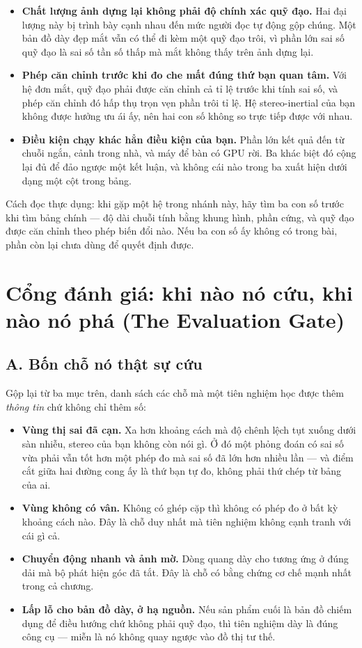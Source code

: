 \documentclass[../../deep_learning.tex]{subfiles}
\begin{document}
\begin{itemize}
\item \textbf{Chất lượng ảnh dựng lại không phải độ chính xác quỹ đạo.} Hai đại lượng này bị trình bày cạnh nhau đến mức người đọc tự động gộp chúng. Một bản đồ dày đẹp mắt vẫn có thể đi kèm một quỹ đạo trôi, vì phần lớn sai số quỹ đạo là sai số tần số thấp mà mắt không thấy trên ảnh dựng lại.
\item \textbf{Phép căn chỉnh trước khi đo che mất đúng thứ bạn quan tâm.} Với hệ đơn mắt, quỹ đạo phải được căn chỉnh cả tỉ lệ trước khi tính sai số, và phép căn chỉnh đó hấp thụ trọn vẹn phần trôi tỉ lệ. Hệ stereo-inertial của bạn không được hưởng ưu ái ấy, nên hai con số không so trực tiếp được với nhau.
\item \textbf{Điều kiện chạy khác hẳn điều kiện của bạn.} Phần lớn kết quả đến từ chuỗi ngắn, cảnh trong nhà, và máy để bàn có GPU rời. Ba khác biệt đó cộng lại đủ để đảo ngược một kết luận, và không cái nào trong ba xuất hiện dưới dạng một cột trong bảng.
\end{itemize}

Cách đọc thực dụng: khi gặp một hệ trong nhánh này, hãy tìm ba con số trước khi tìm bảng chính --- độ dài chuỗi tính bằng khung hình, phần cứng, và quỹ đạo được căn chỉnh theo phép biến đổi nào. Nếu ba con số ấy không có trong bài, phần còn lại chưa dùng để quyết định được.

\section{Cổng đánh giá: khi nào nó cứu, khi nào nó phá (The Evaluation Gate)}
\subsection{A. Bốn chỗ nó thật sự cứu}
Gộp lại từ ba mục trên, danh sách các chỗ mà một tiên nghiệm học được thêm \emph{thông tin} chứ không chỉ thêm số:

\begin{itemize}
\item \textbf{Vùng thị sai đã cạn.} Xa hơn khoảng cách mà độ chênh lệch tụt xuống dưới sàn nhiễu, stereo của bạn không còn nói gì. Ở đó một phỏng đoán có sai số vừa phải vẫn tốt hơn một phép đo mà sai số đã lớn hơn nhiều lần --- và điểm cắt giữa hai đường cong ấy là thứ bạn tự đo, không phải thứ chép từ bảng của ai.
\item \textbf{Vùng không có vân.} Không có ghép cặp thì không có phép đo ở bất kỳ khoảng cách nào. Đây là chỗ duy nhất mà tiên nghiệm không cạnh tranh với cái gì cả.
\item \textbf{Chuyển động nhanh và ảnh mờ.} Dòng quang dày cho tương ứng ở đúng dải mà bộ phát hiện góc đã tắt. Đây là chỗ có bằng chứng cơ chế mạnh nhất trong cả chương.
\item \textbf{Lấp lỗ cho bản đồ dày, ở hạ nguồn.} Nếu sản phẩm cuối là bản đồ chiếm dụng để điều hướng chứ không phải quỹ đạo, thì tiên nghiệm dày là đúng công cụ --- miễn là nó không quay ngược vào đồ thị tư thế.
\end{itemize}
\end{document}
